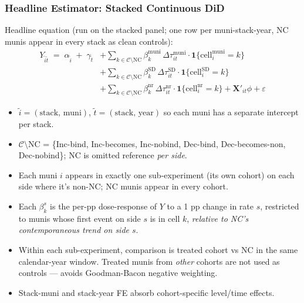 \documentclass[xcolor = x11names, compress, aspectratio = 169]{beamer}
\begin{document}
    \begin{frame}
    \frametitle{Headline Estimator: Stacked Continuous DiD}
        \scriptsize
        \alert{Headline equation} (run on the stacked panel; one row per
        muni-stack-year, NC munis appear in every stack as clean controls):
        \begin{equation*}
        \begin{split}
        Y_{\tilde{i}\tilde{t}} \;=\; \alpha_{\tilde{i}} \;+\; \gamma_{\tilde{t}}
          &+ \sum_{k\in\mathcal{C}\setminus\text{NC}}\beta^{\text{muni}}_k\,\Delta\tau^{\text{muni}}_{it}\cdot\mathbf{1}\{\text{cell}^{\text{muni}}_i=k\} \\
          &+ \sum_{k\in\mathcal{C}\setminus\text{NC}}\beta^{\text{SD}}_k\,\Delta\tau^{\text{SD}}_{it}\cdot\mathbf{1}\{\text{cell}^{\text{SD}}_i=k\} \\
          &+ \sum_{k\in\mathcal{C}\setminus\text{NC}}\beta^{\text{nr}}_k\,\Delta\tau^{\text{nr}}_{it}\cdot\mathbf{1}\{\text{cell}^{\text{nr}}_i=k\}
          + \mathbf{X}'_{it}\phi + \varepsilon
        \end{split}
        \end{equation*}
        \scriptsize
        \begin{itemize}\setlength{\itemsep}{0.02cm}
            \item $\tilde{i}=(\text{stack},\,\text{muni})$, $\tilde{t}=(\text{stack},\,\text{year})$
            so each muni has a separate intercept per stack.
            \item $\mathcal{C}\setminus$NC = \{Inc-bind, Inc-becomes, Inc-nobind,
            Dec-bind, Dec-becomes-non, Dec-nobind\}; NC is omitted reference \emph{per side}.
            \item Each muni $i$ appears in exactly one sub-experiment (its own cohort)
            on each side where it's non-NC; NC munis appear in every cohort.
            \item Each $\beta^s_k$ is the per-pp dose-response of $Y$ to a 1 pp change
            in rate $s$, restricted to munis whose first event on side $s$ is in cell $k$,
            \emph{relative to NC's contemporaneous trend on side $s$}.
            \item Within each sub-experiment, comparison is treated cohort vs NC
            in the same calendar-year window. Treated munis from \emph{other}
            cohorts are not used as controls --- avoids Goodman-Bacon negative weighting.
            \item Stack-muni and stack-year FE absorb cohort-specific level/time effects.
        \end{itemize}
    \end{frame}
\end{document}
